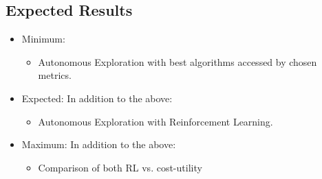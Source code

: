 
\subsection{Expected Results}
\begin{itemize}
	\item Minimum:
	\begin{itemize}
		\item Autonomous Exploration with best algorithms accessed by chosen metrics.
	\end{itemize}
	\item Expected:
	In addition to the above:
	\begin{itemize}
		\item Autonomous Exploration with Reinforcement Learning.
	\end{itemize}
	\item Maximum:
	In addition to the above:
	\begin{itemize}
		\item Comparison of both RL vs. cost-utility
	\end{itemize}
\end{itemize}
